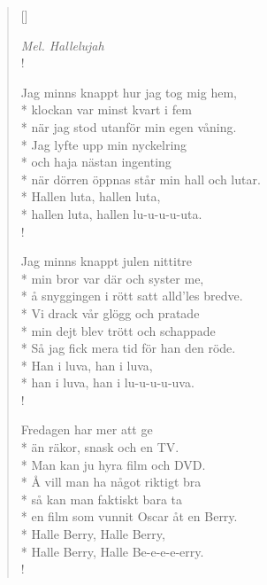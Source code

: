 
\settowidth{\versewidth}{när dörren öppnas står min hall och lutar.}



\begin{verse}[\versewidth]

\flagverse{}
\emph{Mel. Hallelujah}\\!


Jag minns knappt hur jag tog mig hem,\\*
klockan var minst kvart i fem\\*
när jag stod utanför min egen våning.\\*
Jag lyfte upp min nyckelring\\*
och haja nästan ingenting\\*
när dörren öppnas står min hall och lutar.\\*
Hallen luta, hallen luta,\\*
hallen luta, hallen lu-u-u-u-uta.\\!


Jag minns knappt julen nittitre\\*
min bror var där och syster me,\\*
å snyggingen i rött satt alld'les bredve.\\*
Vi drack vår glögg och pratade\\*
min dejt blev trött och schappade\\*
Så jag fick mera tid för han den röde.\\*
Han i luva, han i luva,\\*
han i luva, han i lu-u-u-u-uva.\\!


Fredagen har mer att ge\\*
än räkor, snask och en TV.\\*
Man kan ju hyra film och DVD.\\*
Å vill man ha något riktigt bra\\*
så kan man faktiskt bara ta\\*
en film som vunnit Oscar åt en Berry.\\*
Halle Berry, Halle Berry,\\*
Halle Berry, Halle Be-e-e-e-erry.\\!


\end{verse}


